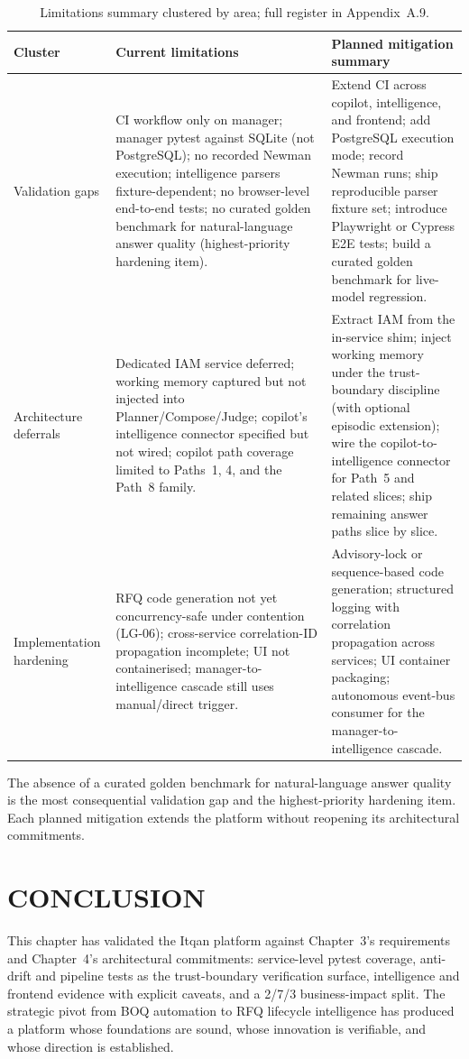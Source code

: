 \begin{table}[H]
\centering
\renewcommand{\arraystretch}{1.4}
\footnotesize
\begin{tabularx}{\textwidth}{|p{2.7cm}|>{\RaggedRight\arraybackslash}X|>{\RaggedRight\arraybackslash}X|}
\hline
\rowcolor{lightgray}
\textbf{Cluster} & \textbf{Current limitations} & \textbf{Planned mitigation summary} \\ \hline
Validation gaps & CI workflow only on manager; manager pytest against SQLite (not PostgreSQL); no recorded Newman execution; intelligence parsers fixture-dependent; no browser-level end-to-end tests; no curated golden benchmark for natural-language answer quality (highest-priority hardening item). & Extend CI across copilot, intelligence, and frontend; add PostgreSQL execution mode; record Newman runs; ship reproducible parser fixture set; introduce Playwright or Cypress E2E tests; build a curated golden benchmark for live-model regression. \\ \hline
Architecture deferrals & Dedicated IAM service deferred; working memory captured but not injected into Planner/Compose/Judge; copilot's intelligence connector specified but not wired; copilot path coverage limited to Paths~1, 4, and the Path~8 family. & Extract IAM from the in-service shim; inject working memory under the trust-boundary discipline (with optional episodic extension); wire the copilot-to-intelligence connector for Path~5 and related slices; ship remaining answer paths slice by slice. \\ \hline
Implementation hardening & RFQ code generation not yet concurrency-safe under contention (LG-06); cross-service correlation-ID propagation incomplete; UI not containerised; manager-to-intelligence cascade still uses manual/direct trigger. & Advisory-lock or sequence-based code generation; structured logging with correlation propagation across services; UI container packaging; autonomous event-bus consumer for the manager-to-intelligence cascade. \\ \hline
\end{tabularx}
\caption{Limitations summary clustered by area; full register in Appendix~A.9.}
\label{tab:limitations_summary}
\end{table}

The absence of a curated golden benchmark for natural-language answer quality is the most consequential validation gap and the highest-priority hardening item. Each planned mitigation extends the platform without reopening its architectural commitments.

\section*{CONCLUSION}
This chapter has validated the Itqan platform against Chapter~3's requirements and Chapter~4's architectural commitments: service-level pytest coverage, anti-drift and pipeline tests as the trust-boundary verification surface, intelligence and frontend evidence with explicit caveats, and a 2/7/3 business-impact split. The strategic pivot from BOQ automation to RFQ lifecycle intelligence has produced a platform whose foundations are sound, whose innovation is verifiable, and whose direction is established.